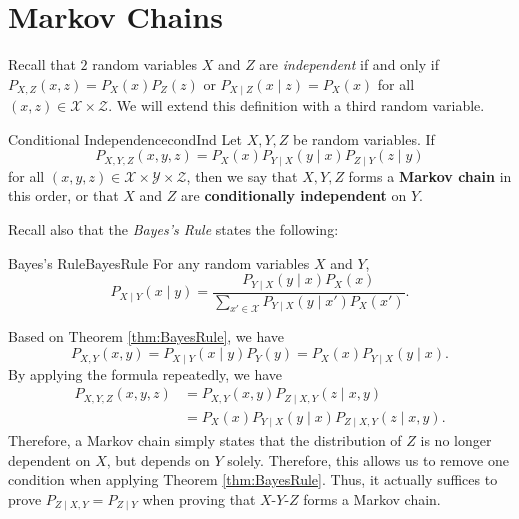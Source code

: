 \documentclass[math]{amznotes}
\theoremstyle{remark}
\begin{document}
\section{Markov Chains}
Recall that $2$ random variables $X$ and $Z$ are \textit{independent} if and only if $P_{X, Z}\left(x, z\right) = P_X\left(x\right)P_Z\left(z\right)$ or $P_{X \mid Z}\left(x \mid z\right) = P_X\left(x\right)$ for all $\left(x, z\right) \in \mathcal{X} \times \mathcal{Z}$. We will extend this definition with a third random variable.
\begin{dfnbox}{Conditional Independence}{condInd}
    Let $X, Y, Z$ be random variables. If 
    \begin{equation*}
        P_{X, Y, Z}\left(x, y, z\right) = P_X\left(x\right)P_{Y \mid X}\left(y \mid x\right)P_{Z \mid Y}\left(z \mid y\right)
    \end{equation*}
    for all $\left(x, y, z\right) \in \mathcal{X} \times \mathcal{Y} \times \mathcal{Z}$, then we say that $X, Y, Z$ forms a {\color{red} \textbf{Markov chain}} in this order, or that $X$ and $Z$ are {\color{red} \textbf{conditionally independent}} on $Y$.
\end{dfnbox}
Recall also that the \textit{Bayes's Rule} states the following:
\begin{thmbox}{Bayes's Rule}{BayesRule}
    For any random variables $X$ and $Y$, 
    \begin{equation*}
        P_{X \mid Y}\left(x \mid y\right) = \frac{P_{Y \mid X}\left(y \mid x\right)P_X\left(x\right)}{\sum_{x' \in \mathcal{X}}P_{Y \mid X}\left(y \mid x'\right)P_X\left(x'\right)}.
    \end{equation*}
\end{thmbox}
Based on Theorem \ref{thm:BayesRule}, we have 
\begin{equation*}
    P_{X, Y}\left(x, y\right) = P_{X \mid Y}\left(x \mid y\right)P_Y\left(y\right) = P_X\left(x\right)P_{Y \mid X}\left(y \mid x\right).
\end{equation*}
By applying the formula repeatedly, we have 
\begin{align*}
    P_{X, Y, Z}\left(x, y, z\right) & = P_{X, Y}\left(x, y\right)P_{Z \mid X, Y}\left(z \mid x, y\right) \\
    & = P_X\left(x\right)P_{Y \mid X}\left(y \mid x\right)P_{Z \mid X, Y}\left(z \mid x, y\right).
\end{align*}
Therefore, a Markov chain simply states that the distribution of $Z$ is no longer dependent on $X$, but depends on $Y$ solely. Therefore, this allows us to remove one condition when applying Theorem \ref{thm:BayesRule}. Thus, it actually suffices to prove $P_{Z \mid X, Y} = P_{Z \mid Y}$ when proving that $X$-$Y$-$Z$ forms a Markov chain.  
 
\end{document}

